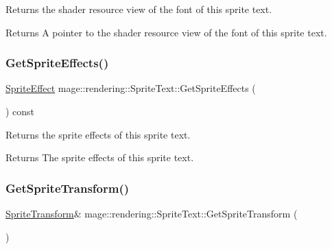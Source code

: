 Returns the shader resource view of the font of this sprite text.

\begin{DoxyReturn}{Returns}
A pointer to the shader resource view of the font of this sprite text. 
\end{DoxyReturn}
\hypertarget{classmage_1_1rendering_1_1_sprite_text_ad9a7ac6ba55ae87a1849b3f1e8e6892b}{}\label{classmage_1_1rendering_1_1_sprite_text_ad9a7ac6ba55ae87a1849b3f1e8e6892b} 
\subsubsection{\texorpdfstring{Get\+Sprite\+Effects()}{GetSpriteEffects()}}
{\footnotesize\ttfamily \hyperlink{namespacemage_1_1rendering_a4dbc3536c87b906f1d41d863ec458e78}{Sprite\+Effect} mage\+::rendering\+::\+Sprite\+Text\+::\+Get\+Sprite\+Effects (\begin{DoxyParamCaption}{ }\end{DoxyParamCaption}) const\hspace{0.3cm}{\ttfamily [noexcept]}}

Returns the sprite effects of this sprite text.

\begin{DoxyReturn}{Returns}
The sprite effects of this sprite text. 
\end{DoxyReturn}
\hypertarget{classmage_1_1rendering_1_1_sprite_text_aab167f1dd0af96e05c34bb631d85e197}{}\label{classmage_1_1rendering_1_1_sprite_text_aab167f1dd0af96e05c34bb631d85e197} 
\subsubsection{\texorpdfstring{Get\+Sprite\+Transform()}{GetSpriteTransform()}\hspace{0.1cm}{\footnotesize\ttfamily [1/2]}}
{\footnotesize\ttfamily \hyperlink{classmage_1_1_sprite_transform}{Sprite\+Transform}\& mage\+::rendering\+::\+Sprite\+Text\+::\+Get\+Sprite\+Transform (\begin{DoxyParamCaption}{ }\end{DoxyParamCaption})\hspace{0.3cm}{\ttfamily [noexcept]}}

